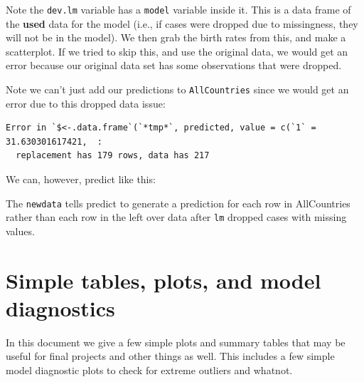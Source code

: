 \documentclass[
  letterpaper,
  DIV=11,
  numbers=noendperiod]{scrreprt}
\newenvironment{Shaded}{\begin{snugshade}}{\end{snugshade}}
\newcommand{\AttributeTok}[1]{\textcolor[rgb]{0.49,0.56,0.16}{#1}}
\newcommand{\FunctionTok}[1]{\textcolor[rgb]{0.02,0.16,0.49}{#1}}
\newcommand{\NormalTok}[1]{\textcolor[rgb]{0.00,0.44,0.13}{#1}}
\newcommand{\OtherTok}[1]{\textcolor[rgb]{0.00,0.44,0.13}{#1}}
\newcommand{\SpecialCharTok}[1]{\textcolor[rgb]{0.25,0.44,0.63}{#1}}
\begin{document}
Note the \texttt{dev.lm} variable has a \texttt{model} variable inside
it. This is a data frame of the \textbf{used} data for the model (i.e.,
if cases were dropped due to missingness, they will not be in the
model). We then grab the birth rates from this, and make a scatterplot.
If we tried to skip this, and use the original data, we would get an
error because our original data set has some observations that were
dropped.

Note we can't just add our predictions to \texttt{AllCountries} since we
would get an error due to this dropped data issue:

\begin{Shaded}
\end{Shaded}

\begin{verbatim}
Error in `$<-.data.frame`(`*tmp*`, predicted, value = c(`1` = 31.630301617421,  : 
  replacement has 179 rows, data has 217
\end{verbatim}

We can, however, predict like this:

\begin{Shaded}
\end{Shaded}

The \texttt{newdata} tells predict to generate a prediction for each row
in AllCountries rather than each row in the left over data after
\texttt{lm} dropped cases with missing values.

\hypertarget{simple-tables-plots-and-model-diagnostics}{%
\chapter{Simple tables, plots, and model
diagnostics}\label{simple-tables-plots-and-model-diagnostics}}

In this document we give a few simple plots and summary tables that may
be useful for final projects and other things as well. This includes a
few simple model diagnostic plots to check for extreme outliers and
whatnot.
\end{document}
